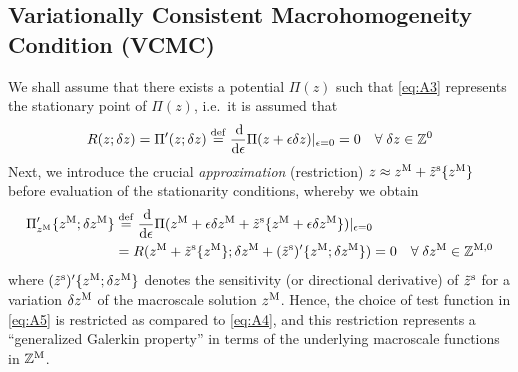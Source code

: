 \documentclass[MikaelDissertation.tex]{subfiles}
\begin{document}
\subsection{Variationally Consistent Macrohomogeneity Condition (VCMC)}

We shall assume that there exists a potential $\Pi(z)$ such that \cref{eq:A3} represents the stationary point of $\Pi(z)$, i.e.\ it is assumed that
\begin{align}
\label{eq:A4} R(z;\delta z) = \Pi'(z;\delta z) \overset{\mathrm{def}}{=} \frac{\operatorname{d \!}}{\operatorname{d \!}\epsilon}\Pi(z+\epsilon\delta z)|_{\epsilon = 0} = 0\quad \forall\;\delta z \in \mathbb{Z}^0
\end{align}
Next, we introduce the crucial \emph{approximation} (restriction) $z \approx z^{\mathrm{M}} + \tilde{z}^{\mathrm{s}}\{z^{\mathrm{M}}\}$ before evaluation of the stationarity conditions, whereby we obtain
\begin{align}
\label{eq:A5} \Pi_{z^{\mathrm{M}}}'\{z^{\mathrm{M}};\delta z^{\mathrm{M}}\} & \overset{\mathrm{def}}{=}
\frac{\operatorname{d \!}}{\operatorname{d \!}\epsilon}\Pi(z^{\mathrm{M}}+\epsilon \delta z^{\mathrm{M}}+\tilde{z}^{\mathrm{s}}\{z^{\mathrm{M}}+\epsilon \delta z^{\mathrm{M}}\})|_{\epsilon = 0} \nonumber \\
& =
R(z^{\mathrm{M}} + \tilde{z}^{\mathrm{s}}\{z^{\mathrm{M}}\}; \delta z^{\mathrm{M}} + (\tilde{z}^{\mathrm{s}})'\{z^{\mathrm{M}};\delta z^{\mathrm{M}}\}) = 0\quad \forall\;\delta z^{\mathrm{M}}\in\mathbb{Z}^{\mathrm{M},0}
\end{align}
where $(\tilde{z}^{\mathrm{s}})'\{z^{\mathrm{M}};\delta z^{\mathrm{M}}\}$ denotes the sensitivity (or directional derivative) of $\tilde z^{\mathrm{s}}$ for a variation $\delta z^{\mathrm{M}}$ of the macroscale solution $z^{\mathrm{M}}$.
Hence, the choice of test function in \cref{eq:A5} is restricted as compared to \cref{eq:A4}, and this restriction represents a ``generalized Galerkin property'' in terms of the underlying macroscale functions in $\mathbb{Z}^{\mathrm{M}}$.
\end{document}
